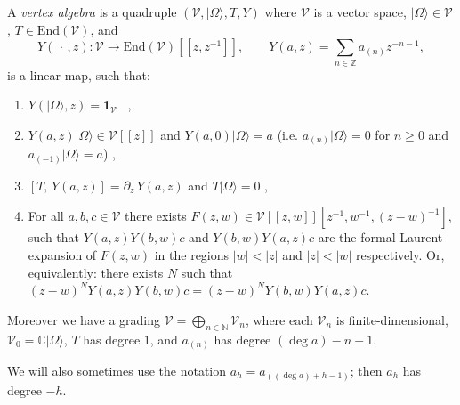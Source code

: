 \documentclass[12pt,letterpaper,reqno]{amsart}
\numberwithin{equation}{section}
\newcommand{\bbC}{\ensuremath{\mathbb C}}
\newcommand{\bbN}{{\mathbb N}}
\newcommand\bid{{\mathbf 1}}
\newcommand\vac{{|\Omega\rangle}}
\newcommand{\vertex}{\mathcal{V}}
\newcommand{\abs}[1]{\lvert#1\rvert}
\begin{document}
\begin{defn} \label{def:vertex-algebra}

A \emph{vertex algebra} is a quadruple \((\vertex, \vac, T, Y)\) where
\(\vertex\) is a vector space, \(\vac \in \vertex \),
\(T \in \mathrm{End}(\vertex)\),
and
\begin{equation}
Y(\,\cdot\,,z): \vertex \to \mathrm{End}(\vertex)[[z,z^{-1}]],\qquad
Y(a,z) = \sum_{n\in \mathbb{Z}} a_{(n)} z^{-n-1},
\end{equation}
is a linear map, such that:

\begin{enumerate}

\item  
$Y(\vac,z) = \bid_{\vertex}$ \, ,

\item
$Y(a,z) \vac \in \vertex[[z]]$ and $Y(a,0) \vac = a$ (i.e. $a_{(n)} \vac = 0$ for $n \ge 0$ and $a_{(-1)} \vac = a$) ,

\item
$[T,\,Y(a,z)] = \partial_z\, Y(a,z)$ and $T \vac = 0$ ,

\item For all $a,b,c \in \vertex$
there exists $F(z,w) \in \vertex[[z,w]][z^{-1},w^{-1},(z-w)^{-1}]$, such that
$Y(a,z) Y(b,w) c$ and 
$Y(b,w) Y(a,z) c$ are the
formal Laurent expansion of $F(z,w)$ in the regions
$\abs{w} < \abs{z}$ and $\abs{z} < \abs{w}$
respectively.
Or, equivalently: there exists $N$ such that $(z-w)^N Y(a,z) Y(b,w) c = (z-w)^N Y(b,w) Y(a,z)  c$.
\end{enumerate}

Moreover we have a grading
$\vertex = \bigoplus_{n \in \bbN} \vertex_n$, where
each $\vertex_n$ is finite-dimensional, $\vertex_0 = \bbC \vac$,
$T$ has degree $1$, and $a_{(n)}$ has degree $(\deg a)-n-1$.
\end{defn}

We will also sometimes use the notation $a_h = a_{((\deg a)+h-1)}$;
then $a_h$ has degree $-h$.
\end{document}
